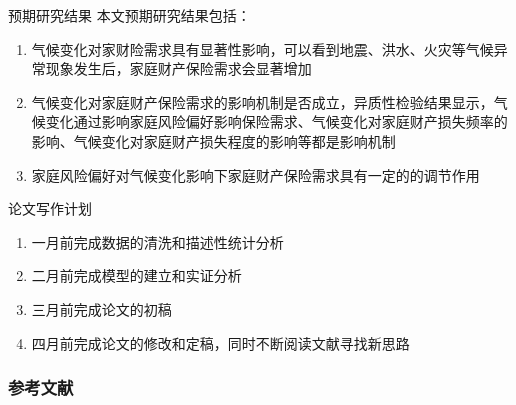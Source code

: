 \documentclass[a4paper,12pt]{ctexbeamer}
\begin{document}
\begin{frame}{预期研究结果}
    本文预期研究结果包括：

    \begin{enumerate}
        \item 气候变化对家财险需求具有显著性影响，可以看到地震、洪水、火灾等气候异常现象发生后，家庭财产保险需求会显著增加
        \item 气候变化对家庭财产保险需求的影响机制是否成立，异质性检验结果显示，气候变化通过影响家庭风险偏好影响保险需求、气候变化对家庭财产损失频率的影响、气候变化对家庭财产损失程度的影响等都是影响机制
        \item 家庭风险偏好对气候变化影响下家庭财产保险需求具有一定的的调节作用
    \end{enumerate}
\end{frame}
\begin{frame}{论文写作计划}
    \begin{enumerate}
        \item 一月前完成数据的清洗和描述性统计分析
        \item 二月前完成模型的建立和实证分析
        \item 三月前完成论文的初稿
        \item 四月前完成论文的修改和定稿，同时不断阅读文献寻找新思路
    \end{enumerate}
\end{frame}



\appendix
\nocite{*}
\begin{frame}[allowframebreaks]
    \frametitle{参考文献}
    \tiny{\printbibliography}
\end{frame}
\end{document}
